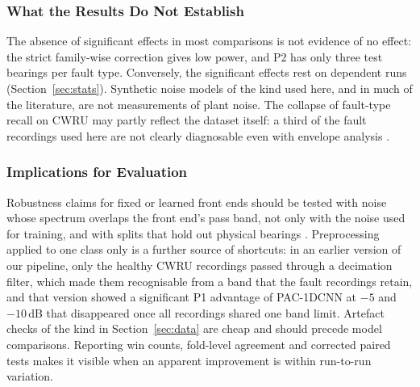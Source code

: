 \documentclass[conference]{IEEEtran}
\begin{document}
\subsubsection{What the Results Do Not Establish}
The absence of significant effects in most comparisons is not evidence of no effect: the strict family-wise correction gives low power, and P2 has only three test bearings per fault type. Conversely, the significant effects rest on dependent runs (Section~\ref{sec:stats}). Synthetic noise models of the kind used here, and in much of the literature, are not measurements of plant noise. The collapse of fault-type recall on CWRU may partly reflect the dataset itself: a third of the fault recordings used here are not clearly diagnosable even with envelope analysis \cite{smith2015cwru}.

\subsubsection{Implications for Evaluation}
Robustness claims for fixed or learned front ends should be tested with noise whose spectrum overlaps the front end's pass band, not only with the noise used for training, and with splits that hold out physical bearings \cite{vieira2026realistic}. Preprocessing applied to one class only is a further source of shortcuts: in an earlier version of our pipeline, only the healthy CWRU recordings passed through a decimation filter, which made them recognisable from a band that the fault recordings retain, and that version showed a significant P1 advantage of PAC-1DCNN at $-5$ and $-10$\,dB that disappeared once all recordings shared one band limit. Artefact checks of the kind in Section~\ref{sec:data} are cheap and should precede model comparisons. Reporting win counts, fold-level agreement and corrected paired tests makes it visible when an apparent improvement is within run-to-run variation.
\end{document}
